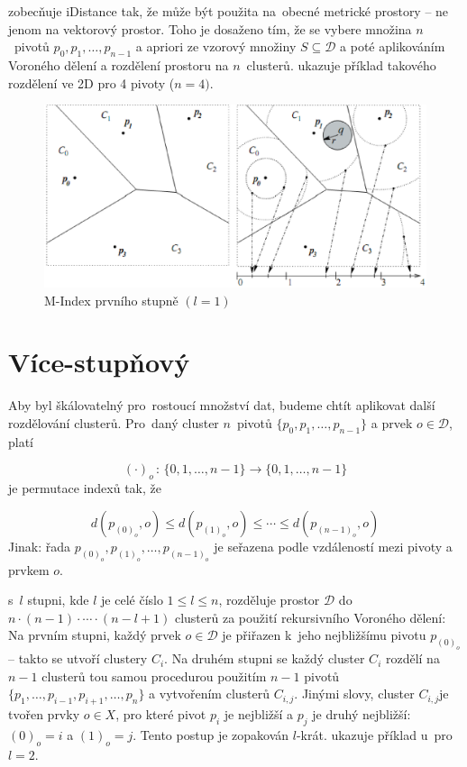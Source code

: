 \MIndex zobecňuje iDistance tak, že může být použita na~obecné metrické
prostory -- ne jenom na vektorový prostor\@. Toho je dosaženo tím,
že se vybere množina $n$~pivotů $p_{0},p_{1},\ldots,p_{n-1}$ a
apriori ze vzorový množiny $S\subseteq\mathcal{D}$ a poté aplikováním
Voroného dělení a rozdělení prostoru na $n$~clusterů.  ukazuje
příklad takového rozdělení ve 2D pro 4 pivoty ($n=4)$.

\begin{figure}[t]
\begin{centering}
\includegraphics[scale=0.5]{m-index-level-one}\caption{M-Index prvního stupně $(l=1)$\label{fig:M-Index-level-one}}

\par\end{centering}

\end{figure}



\section{Více-stupňový \MIndex}

Aby byl \MIndex škálovatelný pro~rostoucí množství dat, budeme chtít
aplikovat další rozdělování clusterů. Pro~daný cluster $n$~pivotů
$\{p_{0},p_{1},\ldots,p_{n-1}\}$ a prvek $o\in\mathcal{D}$, platí

\[
(\cdot)_{o}\,:\,\{0,1,\ldots,n-1\}\rightarrow\{0,1,\ldots,n-1\}
\]
je permutace indexů tak, že

\[
d(p_{(0)_{o}},o)\leq d(p_{(1)_{o}},o)\leq\cdots\leq d(p_{(n-1)_{o}},o)
\]
Jinak: řada $p_{(0)_{o}},p_{(1)_{o}},\ldots,p_{(n-1)_{o}}$ je seřazena
podle vzdáleností mezi pivoty a prvkem $o$\@.

\MIndex s~$l$ stupni, kde $l$ je celé číslo $1\leq l\leq n$, rozděluje
prostor $\mathcal{D}$ do $n\cdot(n-1)\cdot\cdots\cdot(n-l+1)$ clusterů
za použití rekursivního Voroného dělení: Na prvním stupni, každý
prvek $o\in\mathcal{D}$ je přiřazen k~jeho nejbližšímu pivotu $p_{(0)_{o}}$--
takto se utvoří clustery $C_{i}$\@. Na druhém stupni se každý cluster
$C_{i}$ rozdělí na $n-1$ clusterů tou samou procedurou použitím
$n-1$ pivotů $\{p_{1},\ldots,p_{i-1},p_{i+1},\ldots,p_{n}\}$ a vytvořením
clusterů $C_{i,j}$\@. Jinými slovy, cluster $C_{i,j}$je tvořen
prvky $o\in X$, pro které pivot $p_{i}$ je nejbližší a $p_{j}$
je druhý nejbližší: $(0)_{o}=i$ a $(1)_{o}=j$\@. Tento postup je
zopakován $l$-krát\@.  ukazuje
příklad \MIndex u~pro $l=2$\@.

